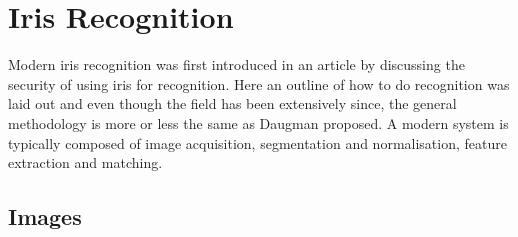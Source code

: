 \section{Iris Recognition}
\label{sec:Iris_Recognition_Research}
Modern iris recognition was first introduced in an article by \cite{Daugman1993} discussing the security of using iris for recognition. Here an outline of how to do recognition was laid out and even though the field has been extensively  since, the general methodology is more or less the same as Daugman proposed. A modern system is typically composed of image acquisition, segmentation and normalisation, feature extraction and matching. 

\subsection{Images}
